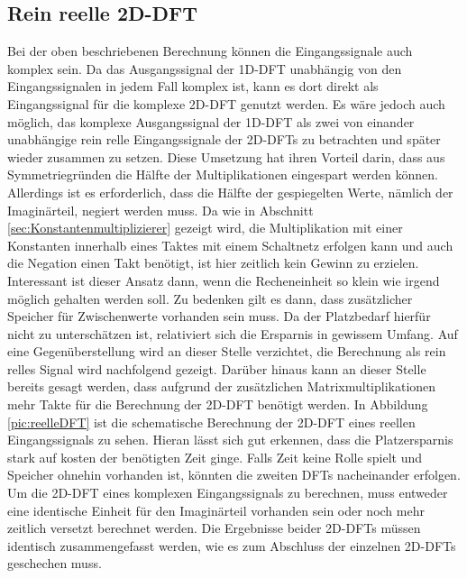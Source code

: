 \subsection{Rein reelle 2D-DFT}
Bei der oben beschriebenen Berechnung können die Eingangssignale auch komplex sein. Da das Ausgangssignal der 1D-DFT unabhängig von den Eingangssignalen in jedem Fall 
komplex ist, kann es dort direkt als Eingangssignal für die komplexe 2D-DFT genutzt werden. 
Es wäre jedoch auch möglich, das komplexe Ausgangssignal der 1D-DFT als zwei von einander unabhängige rein relle Eingangssignale der 2D-DFTs zu betrachten und später 
wieder zusammen zu setzen. 
Diese Umsetzung hat ihren Vorteil darin, dass aus Symmetriegründen die Hälfte der Multiplikationen eingespart werden können. Allerdings ist es erforderlich, dass die 
Hälfte der gespiegelten Werte, nämlich der Imaginärteil, negiert werden muss. Da wie in Abschnitt \ref{sec:Konstantenmultiplizierer} gezeigt wird, die Multiplikation
mit einer Konstanten innerhalb eines Taktes mit einem Schaltnetz erfolgen kann und auch die Negation einen Takt benötigt, ist hier zeitlich kein Gewinn zu erzielen.
Interessant ist dieser Ansatz dann, wenn die Recheneinheit so klein wie irgend möglich gehalten werden soll. Zu bedenken gilt es dann, dass zusätzlicher Speicher für 
Zwischenwerte vorhanden sein muss. Da der Platzbedarf hierfür nicht zu unterschätzen ist, relativiert sich die Ersparnis in gewissem Umfang. Auf eine Gegenüberstellung
wird an dieser Stelle verzichtet, die Berechnung als rein relles Signal wird nachfolgend gezeigt.
Darüber hinaus kann an dieser Stelle bereits gesagt werden, dass aufgrund der zusätzlichen Matrixmultiplikationen mehr Takte für die Berechnung der 2D-DFT benötigt werden.
In Abbildung \ref{pic:reelleDFT} ist die schematische Berechnung der 2D-DFT eines reellen Eingangssignals zu sehen. Hieran lässt sich gut erkennen, dass die Platzersparnis
stark auf kosten der benötigten Zeit ginge. Falls Zeit keine Rolle spielt und Speicher ohnehin vorhanden ist, könnten die zweiten DFTs nacheinander erfolgen.
Um die 2D-DFT eines komplexen Eingangssignals zu berechnen, muss entweder eine identische Einheit für den Imaginärteil vorhanden sein oder noch mehr zeitlich versetzt 
berechnet werden. Die Ergebnisse beider 2D-DFTs müssen identisch zusammengefasst werden, wie es zum Abschluss der einzelnen 2D-DFTs geschechen muss.

